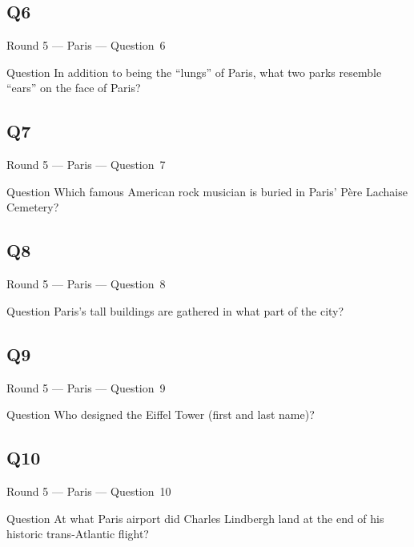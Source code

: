\documentclass[11pt]{beamer}
\begin{document}
\subsection*{Q6}
\begin{frame}[t]{Round 5 --- Paris --- \mbox{Question 6}}
\vspace{-0.5em}
\begin{block}{Question}
In addition to being the ``lungs'' of Paris, what two parks resemble ``ears'' on the face of Paris?
\end{block}
\end{frame}
\subsection*{Q7}
\begin{frame}[t]{Round 5 --- Paris --- \mbox{Question 7}}
\vspace{-0.5em}
\begin{block}{Question}
Which famous American rock musician is buried in Paris' P{\`e}re Lachaise Cemetery?
\end{block}
\end{frame}
\subsection*{Q8}
\begin{frame}[t]{Round 5 --- Paris --- \mbox{Question 8}}
\vspace{-0.5em}
\begin{block}{Question}
Paris's tall buildings are gathered in what part of the city?
\end{block}
\end{frame}
\subsection*{Q9}
\begin{frame}[t]{Round 5 --- Paris --- \mbox{Question 9}}
\vspace{-0.5em}
\begin{block}{Question}
Who designed the Eiffel Tower (first and last name)?
\end{block}
\end{frame}
\subsection*{Q10}
\begin{frame}[t]{Round 5 --- Paris --- \mbox{Question 10}}
\vspace{-0.5em}
\begin{block}{Question}
At what Paris airport did Charles Lindbergh land at the end of his historic trans-Atlantic flight?
\end{block}
\end{frame}
\end{document}
